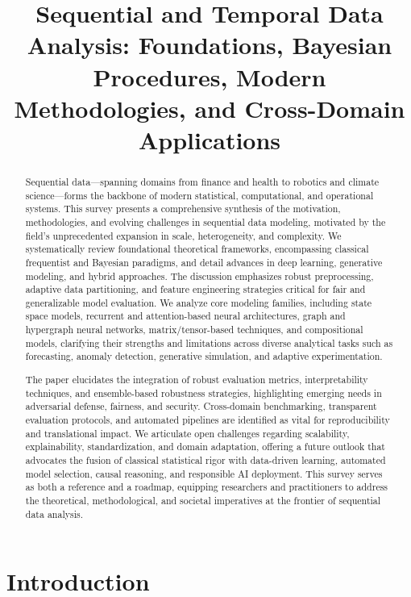 \title{Sequential and Temporal Data Analysis: Foundations, Bayesian Procedures, Modern Methodologies, and Cross-Domain Applications}
\maketitle

\begin{abstract}
Sequential data—spanning domains from finance and health to robotics and climate science—forms the backbone of modern statistical, computational, and operational systems. This survey presents a comprehensive synthesis of the motivation, methodologies, and evolving challenges in sequential data modeling, motivated by the field’s unprecedented expansion in scale, heterogeneity, and complexity. We systematically review foundational theoretical frameworks, encompassing classical frequentist and Bayesian paradigms, and detail advances in deep learning, generative modeling, and hybrid approaches. The discussion emphasizes robust preprocessing, adaptive data partitioning, and feature engineering strategies critical for fair and generalizable model evaluation. We analyze core modeling families, including state space models, recurrent and attention-based neural architectures, graph and hypergraph neural networks, matrix/tensor-based techniques, and compositional models, clarifying their strengths and limitations across diverse analytical tasks such as forecasting, anomaly detection, generative simulation, and adaptive experimentation.

The paper elucidates the integration of robust evaluation metrics, interpretability techniques, and ensemble-based robustness strategies, highlighting emerging needs in adversarial defense, fairness, and security. Cross-domain benchmarking, transparent evaluation protocols, and automated pipelines are identified as vital for reproducibility and translational impact. We articulate open challenges regarding scalability, explainability, standardization, and domain adaptation, offering a future outlook that advocates the fusion of classical statistical rigor with data-driven learning, automated model selection, causal reasoning, and responsible AI deployment. This survey serves as both a reference and a roadmap, equipping researchers and practitioners to address the theoretical, methodological, and societal imperatives at the frontier of sequential data analysis.
\end{abstract}

\section{Introduction}

